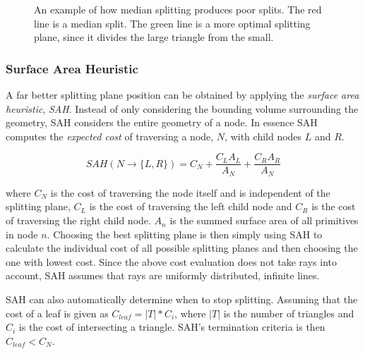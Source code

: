 \begin{figure}
  \centering
  \caption[An example of median splitting producing poor splits.]{An
    example of how median splitting produces poor splits. The red line
    is a median split. The green line is a more optimal splitting
    plane, since it divides the large triangle from the small.}
  \label{fig:crapMedian}
\end{figure}

\subsubsection{Surface Area Heuristic}


A far better splitting plane position can be obtained by applying the
\textit{surface area heuristic}, \textit{SAH}. Instead of only
considering the bounding volume surrounding the geometry, SAH
considers the entire geometry of a node. In essence SAH computes the
\textit{expected cost} of traversing a node, $N$, with child nodes $L$
and $R$.

\begin{displaymath}
  SAH(N \rightarrow \{L, R\}) = C_N + \frac{C_L A_L}{A_N} +
  \frac{C_R A_R}{A_N}
\end{displaymath}

where $C_N$ is the cost of traversing the node itself and is
independent of the splitting plane, $C_L$ is the cost of traversing
the left child node and $C_R$ is the cost of traversing the right
child node. $A_n$ is the summed surface area of all primitives in node
$n$. Choosing the best splitting plane is then simply using SAH to
calculate the individual cost of all possible splitting planes and
then choosing the one with lowest cost. Since the above cost
evaluation does not take rays into account, SAH assumes that rays are
uniformly distributed, infinite lines.

SAH can also automatically determine when to stop splitting. Assuming
that the cost of a leaf is given as $C_{leaf} = |T| * C_i$, where
$|T|$ is the number of triangles and $C_i$ is the cost of intersecting
a triangle. SAH's termination criteria is then $C_{leaf} < C_N$.

